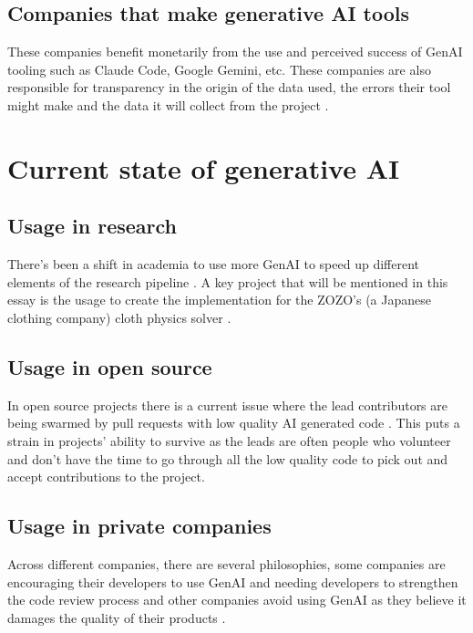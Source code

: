 \subsection{Companies that make generative AI tools}
These companies benefit monetarily from the use and perceived success of GenAI tooling such as Claude Code, Google Gemini, etc. These companies are also responsible for transparency in the origin of the data used, the errors their tool might make and the data it will collect from the project \cite{claude, microsoft-ai-future, amazon-ai-guard-rails}.

\section{Current state of generative AI}
\subsection{Usage in research}
There's been a shift in academia to use more GenAI to speed up different elements of the research pipeline \cite{academia-ai}. A key project that will be mentioned in this essay is the usage to create the implementation for the ZOZO's (a Japanese clothing company) cloth physics solver \cite{ppf-solver, ppf-solver-whitepaper}.

\subsection{Usage in open source}
In open source projects there is a current issue where the lead contributors are being swarmed by pull requests with low quality AI generated code \cite{open-source-bother}. This puts a strain in projects' ability to survive as the leads are often people who volunteer and don't have the time to go through all the low quality code to pick out and accept contributions to the project.

\subsection{Usage in private companies}
Across different companies, there are several philosophies, some companies are encouraging their developers to use GenAI and needing developers to strengthen the code review process \cite{amazon-ai, amazon-ai-layoffs} and other companies avoid using GenAI as they believe it damages the quality of their products \cite{nintendo-ai}.
